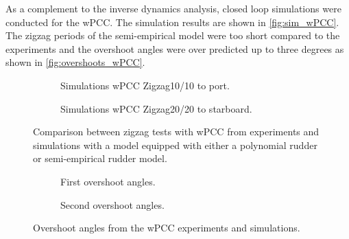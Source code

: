 As a complement to the inverse dynamics analysis, closed loop simulations were conducted for the wPCC. The simulation results are shown in \autoref{fig:sim_wPCC}. The zigzag periods of the semi-empirical model were too short compared to the experiments and the overshoot angles were over predicted up to three degrees as shown in \autoref{fig:overshoots_wPCC}.   
\begin{figure}[h]
     \centering
     \begin{subfigure}[b]{\textwidth}
         \centering
         
        \caption{Simulations wPCC Zigzag10/10 to port.}
        \label{fig:sim_wPCC_10}
     \end{subfigure}
     \vfill
     \begin{subfigure}[b]{\textwidth}
        \centering
        
        \caption{Simulations wPCC Zigzag20/20 to starboard.}
        \label{fig:sim_wPCC_20}
     \end{subfigure}
        \caption{Comparison between zigzag tests with wPCC from experiments and simulations with a model equipped with either a polynomial rudder or semi-empirical rudder model.}
        \label{fig:sim_wPCC}
\end{figure}
\begin{figure}[h]
     \centering
     \begin{subfigure}[b]{\textwidth}
         \centering
         
        \caption{First overshoot angles.}
        \label{fig:overhoots1_wPCC}
     \end{subfigure}
     \vfill
     \begin{subfigure}[b]{\textwidth}
         \centering
         
        \caption{Second overshoot angles.}
        \label{fig:overhoots2_wPCC}
     \end{subfigure}
     
        \caption{Overshoot angles from the wPCC experiments and simulations.}
        \label{fig:overshoots_wPCC}
\end{figure}